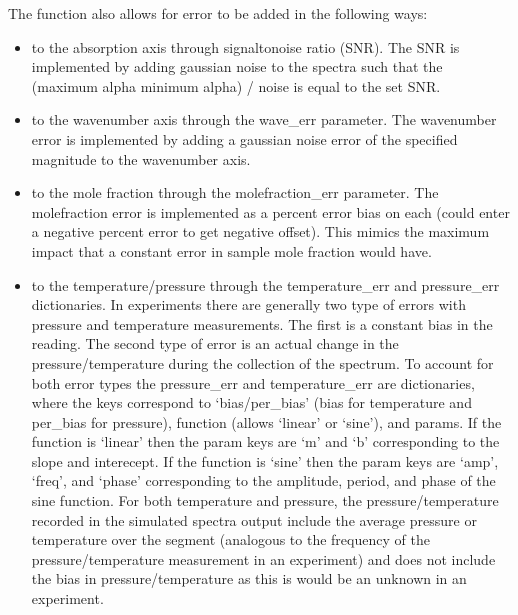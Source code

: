 \documentclass[letterpaper,10pt,english]{sphinxmanual}
\begin{document}
\sphinxAtStartPar
The {\hyperref[\detokenize{MATS:MATS.spectrum.simulate_spectrum}]{}} function also allows for error to be added in the following ways:
\begin{itemize}
\item {} 
\sphinxAtStartPar
to the absorption axis through signal\sphinxhyphen{}to\sphinxhyphen{}noise ratio (SNR).  The SNR is implemented by adding  gaussian noise to the spectra such that the (maximum alpha \sphinxhyphen{} minimum alpha) / noise is equal to the set SNR.

\item {} 
\sphinxAtStartPar
to the wavenumber axis through the wave\_err parameter.  The wavenumber error is implemented by adding a gaussian noise error of the specified magnitude to the wavenumber axis.

\item {} 
\sphinxAtStartPar
to the mole fraction through the molefraction\_err parameter.  The molefraction error is implemented as a percent error bias on each (could enter a negative percent error to get negative offset).  This mimics the maximum impact that a constant error in sample mole fraction would have.

\item {} 
\sphinxAtStartPar
to the temperature/pressure through the temperature\_err and pressure\_err dictionaries.  In experiments there are generally two type of errors with pressure and temperature measurements.  The first is a constant bias in the reading.  The second type of error is an actual change in the pressure/temperature during the collection of the spectrum.  To account for both error types the pressure\_err and temperature\_err are dictionaries, where the keys correspond to ‘bias/per\_bias’ (bias for temperature and per\_bias for pressure), function (allows ‘linear’ or ‘sine’), and params.  If the function is ‘linear’ then the param keys are ‘m’ and ‘b’ corresponding to the slope and interecept. If the function is ‘sine’ then the param keys are ‘amp’, ‘freq’, and ‘phase’ corresponding to the amplitude, period, and phase of the sine function.  For both temperature and pressure, the pressure/temperature recorded in the simulated spectra output include the average pressure or temperature over the segment (analogous to the frequency of the pressure/temperature measurement in an experiment) and does not include the bias in pressure/temperature as this is would be an unknown in an experiment.

\end{itemize}
\end{document}
